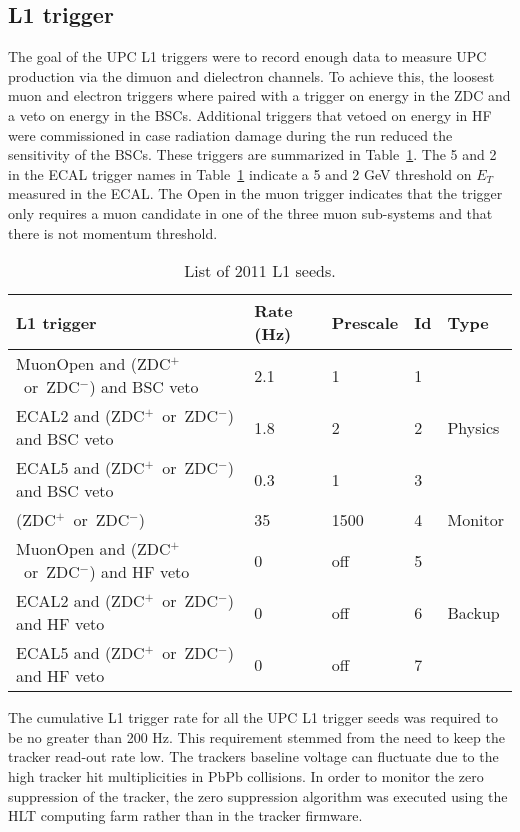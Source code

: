     \subsection{\label{sec:l1Trigger} L1 trigger}
      The goal of the UPC L1 triggers were to record enough data to measure 
        UPC \JPsi{} production via the dimuon and dielectron channels.
      To achieve this, the loosest muon and electron triggers where paired with
        a trigger on energy in the ZDC and a veto on energy in the BSCs.
      Additional triggers that vetoed on energy in HF were commissioned in case
        radiation damage during the run reduced the sensitivity of the BSCs.
      These triggers are summarized in Table~\ref{tab:l1Triggers2011}.
      The 5 and 2 in the ECAL trigger names in Table~\ref{tab:l1Triggers2011}
        indicate a 5 and 2 GeV threshold on $E_{T}$ measured in the ECAL.
      The Open in the muon trigger indicates that the trigger only 
        requires a muon candidate in one of the three muon sub-systems and that
        there is not momentum threshold.

      \begin{table}[h]
        \centering
        \begin{tabular}{|l|l|l|l|l|}
          \hline L1 trigger & Rate (Hz) & Prescale & Id & Type \\ \hline \hline
          MuonOpen and (ZDC$^{+}$~or~ZDC$^{-}$) and BSC veto & 2.1 & 1 & 1 & \multirow{3}{*}{Physics} \\  \hhline{----~}
          ECAL2 and (ZDC$^{+}$~or~ZDC$^{-}$) and BSC veto & 1.8 & 2 & 2 & \\  \hhline{----~}
          ECAL5 and (ZDC$^{+}$~or~ZDC$^{-}$) and BSC veto & 0.3 & 1 & 3 & \\  \hline
          (ZDC$^{+}$~or~ZDC$^{-}$) & 35 & 1500 & 4 & Monitor \\  \hline
          MuonOpen and (ZDC$^{+}$~or~ZDC$^{-}$) and HF veto & 0 & off & 5 & \multirow{3}{*}{Backup} \\ \hhline{----~}
          ECAL2 and (ZDC$^{+}$~or~ZDC$^{-}$) and HF veto & 0 & off & 6 & \\  \hhline{----~}
          ECAL5 and (ZDC$^{+}$~or~ZDC$^{-}$) and HF veto & 0 & off & 7 & \\  \hline
        \end{tabular}
        \caption{List of 2011 L1 seeds.}
        \label{tab:l1Triggers2011}
      \end{table}
      The cumulative L1 trigger rate for all the UPC L1 trigger seeds was
        required to be no greater than 200 Hz.
      This requirement stemmed from the need to keep the tracker read-out rate
        low. 
      The trackers baseline voltage can fluctuate due to the high tracker hit 
        multiplicities in PbPb collisions.
      In order to monitor the zero suppression of the tracker, the zero 
        suppression algorithm was executed using the HLT computing farm 
	      rather than in the tracker firmware.

